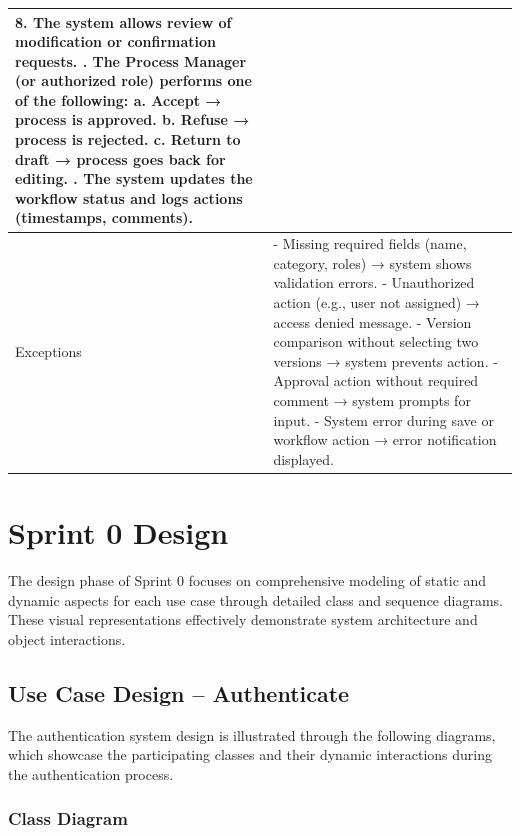 \begin{table}[H]
\begin{tabular}{|p{3cm}|p{12cm}|}
8. The system allows review of modification or confirmation requests. \newline
9. The Process Manager (or authorized role) performs one of the following: \newline
   a. Accept → process is approved. \newline
   b. Refuse → process is rejected. \newline
   c. Return to draft → process goes back for editing. \newline
10. The system updates the workflow status and logs actions (timestamps, comments). \\
\hline
Exceptions & 
- Missing required fields (name, category, roles) → system shows validation errors. \newline
- Unauthorized action (e.g., user not assigned) → access denied message. \newline
- Version comparison without selecting two versions → system prevents action. \newline
- Approval action without required comment → system prompts for input. \newline
- System error during save or workflow action → error notification displayed. \\
\hline
\end{tabular}
\end{table}
\section{Sprint 0 Design}

The design phase of Sprint 0 focuses on comprehensive modeling of static and dynamic aspects for each use case through detailed class and sequence diagrams. These visual representations effectively demonstrate system architecture and object interactions.

\subsection{Use Case Design -- Authenticate}

The authentication system design is illustrated through the following diagrams, which showcase the participating classes and their dynamic interactions during the authentication process.

\subsubsection{Class Diagram}

